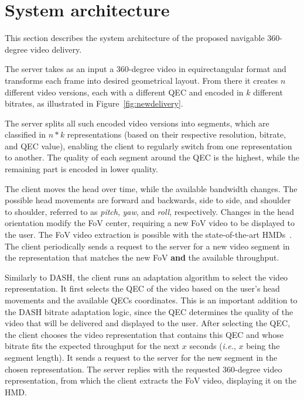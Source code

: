 \section{System architecture}

This section describes the system architecture of the proposed navigable 360-degree video delivery. %

 The server takes as an input a 360-degree video in equirectangular format and transforms each frame into desired geometrical layout. From there it creates $n$ different video versions, each with a different QEC and encoded in $k$ different bitrates, as illustrated in Figure~\ref{fig:newdelivery}.

The server splits all such encoded video versions into segments, which are classified in $n*k$ representations (based on their respective resolution, bitrate, and QEC value), enabling the client to regularly switch from one representation to another. The quality of each segment around the QEC is the highest, while the remaining part is encoded in lower quality.

 The client moves the head over time, while the available bandwidth changes. The possible head movements are forward and backwards, side to side, and shoulder to shoulder, referred to as \emph{pitch}, \emph{yaw}, and \emph{roll}, respectively. Changes in the head orientation modify the FoV center, requiring a new FoV video to be displayed to the user. The FoV video extraction is possible with the state-of-the-art HMDs~\cite{fovhmds}. The client periodically sends a request to the server for a new video segment in the representation that matches the new FoV \textbf{and} the available throughput.

 Similarly to DASH, the client runs an adaptation algorithm to select the video representation.
It first selects the QEC of the video based on the user's head movements and the available QECs coordinates. This is an important addition to the DASH bitrate adaptation logic, since the QEC determines the quality of the video that will be delivered and displayed to the user. After selecting the QEC, the client chooses the video representation that contains this QEC and whose bitrate fits the expected throughput for the next $x$ seconds (\textit{i.e.}, $x$ being the segment length). It sends a request to the server for the new segment in the chosen representation. The server replies with the requested 360-degree video representation, from which the client extracts the FoV video, displaying it on the HMD. %

